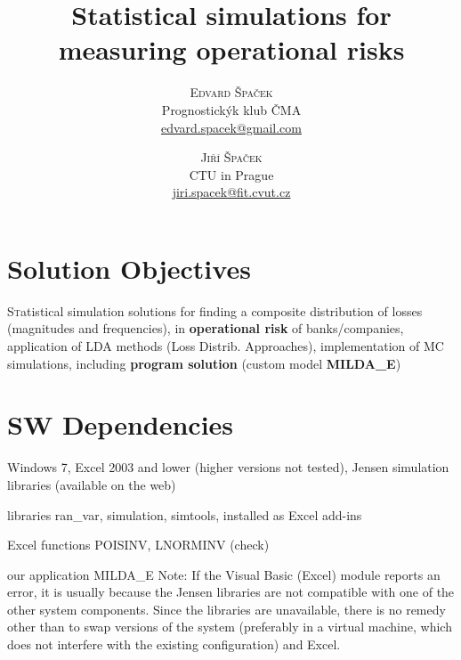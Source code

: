 \documentclass{article}
\title{\vspace{-15mm}\fontsize{24pt}{10pt}\selectfont\textbf{Statistical simulations for measuring operational risks}} %
\author{
\large
\textsc{Edvard Špaček} \\
\normalsize Prognostickýk klub ČMA \\ %
\normalsize \href{mailto:edvard.spacek@gmail.com}{edvard.spacek@gmail.com} %
\and
\large
\textsc{Jiří Špaček} \\
\normalsize CTU in Prague \\ %
\normalsize \href{mailto:jiri.spacek@fit.cvut.cz}{jiri.spacek@fit.cvut.cz} %
\and
\vspace{-5mm}
}
\date{}
\begin{document}
\maketitle %

\thispagestyle{fancy} %







\section{Solution Objectives}

\lettrine[nindent=0em,lines=3]{S} tatistical simulation solutions for finding a composite distribution of losses (magnitudes and frequencies), in \textbf{operational risk} of banks/companies, application of LDA methods (Loss Distrib. Approaches), implementation of MC simulations, including \textbf{program solution} (custom model \textbf{MILDA\_E})




\section{SW Dependencies}

\begin{compactitem}
\item Windows 7, Excel 2003 and lower (higher versions not tested), Jensen simulation libraries (available on the web)
\item libraries ran\_var, simulation, simtools, installed as Excel add-ins
\item Excel functions POISINV, LNORMINV (check)
\item our application MILDA\_E
Note: If the Visual Basic (Excel) module reports an error, it is usually because the Jensen libraries are not compatible with one of the other system components. Since the libraries are unavailable, there is no remedy other than to swap versions of the system (preferably in a virtual machine, which does not interfere with the existing configuration) and Excel.

\end{compactitem}
\end{document}
